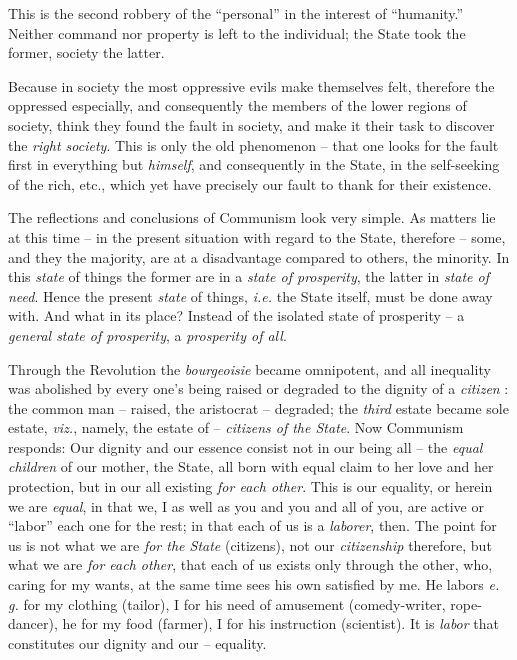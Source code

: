 \documentclass[12pt,a4paper]{book}
\begin{document}
This is the second robbery of the ``personal'' in the interest of 
``humanity.'' Neither command nor property is left to the individual; the 
State took the former, society the latter.

Because in society the most oppressive evils make themselves felt, therefore 
the oppressed especially, and consequently the members of the lower regions of 
society, think they found the fault in society, and make it their task to 
discover the \textit{right society}. This is only the old phenomenon -- that 
one looks for the fault first in everything but \textit{himself}, and 
consequently in the State, in the self-seeking of the rich, etc., which yet 
have precisely our fault to thank for their existence.

 The reflections and conclusions of Communism look very simple. As matters lie 
at this time -- in the present situation with regard to the State, therefore 
-- some, and they the majority, are at a disadvantage compared to others, the 
minority. In this \textit{state} of things the former are in a \textit{state 
of prosperity}, the latter in \textit{state of need}. Hence the present 
\textit{state} of things, \textit{i.e.} the State itself, must be done away 
with. And what in its place? Instead of the isolated state of prosperity -- a 
\textit{general state of prosperity}, a \textit{prosperity of all}.

Through the Revolution the \textit{bourgeoisie} became omnipotent, and all 
inequality was abolished by every one's being raised or degraded to the 
dignity of a \textit{citizen} : the common man -- raised, the aristocrat -- 
degraded; the \textit{third} estate became sole estate, \textit{viz.}, namely, 
the estate of -- \textit{citizens of the State}. Now Communism responds: Our 
dignity and our essence consist not in our being all -- the \textit{equal 
children} of our mother, the State, all born with equal claim to her love and 
her protection, but in our all existing \textit{for each other}. This is our 
equality, or herein we are \textit{equal}, in that we, I as well as you and 
you and all of you, are active or ``labor'' each one for the rest; in that 
each of us is a \textit{laborer}, then. The point for us is not what we are 
\textit{for the State} (citizens), not our \textit{citizenship} therefore, but 
what we are \textit{for each other}, that each of us exists only through the 
other, who, caring for my wants, at the same time sees his own satisfied by 
me. He labors \textit{e. g.} for my clothing (tailor), I for his need of 
amusement (comedy-writer, rope-dancer), he for my food (farmer), I for his 
instruction (scientist). It is \textit{labor} that constitutes our dignity and 
our -- equality.
\end{document}
